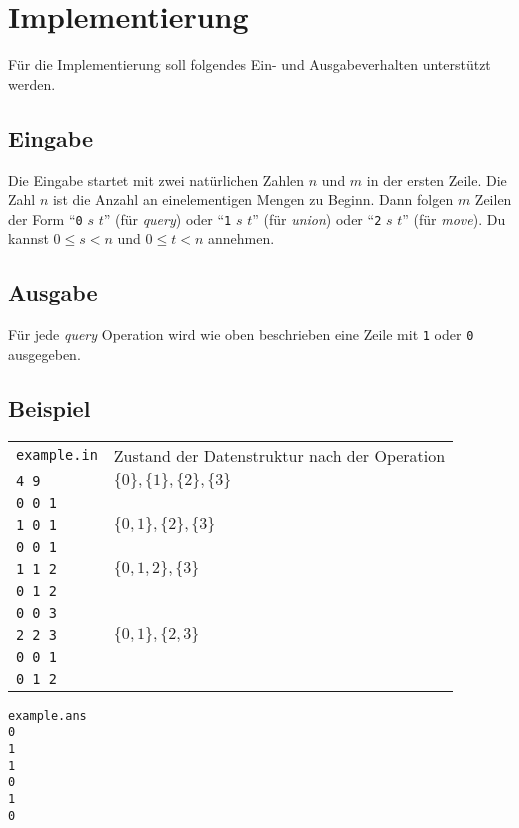 \documentclass{uebung_cs}
\begin{document}
  \appendix
  \section{Implementierung}\label{implementierung}
  Für die Implementierung soll folgendes Ein- und Ausgabeverhalten unterstützt werden.
  \subsection*{Eingabe}
  
  Die Eingabe startet mit zwei natürlichen Zahlen $n$ und $m$ in der ersten Zeile.
  Die Zahl $n$ ist die Anzahl an einelementigen Mengen zu Beginn.
  Dann folgen $m$ Zeilen der Form
  \enquote{\texttt{0} $s$ $t$} (für \emph{query}) oder \enquote{\texttt{1} $s$ $t$} (für \emph{union}) oder \enquote{\texttt{2} $s$ $t$} (für \emph{move}).
  Du kannst $0\leq s< n$ und $0\leq t< n$ annehmen.

  \subsection*{Ausgabe}
  
  Für jede \emph{query} Operation wird wie oben beschrieben eine Zeile mit \texttt{1} oder \texttt{0} ausgegeben.
  
  \subsection*{Beispiel}
  \begin{tabular}{ll}
  \texttt{example.in}& Zustand der Datenstruktur nach der Operation\\
    \texttt{4 9}   & $\{0\}, \{1\}, \{2\},\{3\}$\\
    \texttt{0 0 1} \\
    \texttt{1 0 1} & $\{0, 1\}, \{2\},\{3\}$ \\
    \texttt{0 0 1} &\\
    \texttt{1 1 2} & $\{0, 1, 2\},\{3\}$ \\
    \texttt{0 1 2} &\\
    \texttt{0 0 3} &\\
    \texttt{2 2 3}   & $\{0, 1\}, \{2,3\}$ \\
    \texttt{0 0 1} &\\
    \texttt{0 1 2} &
  \end{tabular}

  \noindent
  \begin{verbatim}
example.ans
0
1
1
0
1
0
  \end{verbatim}
\end{document}
